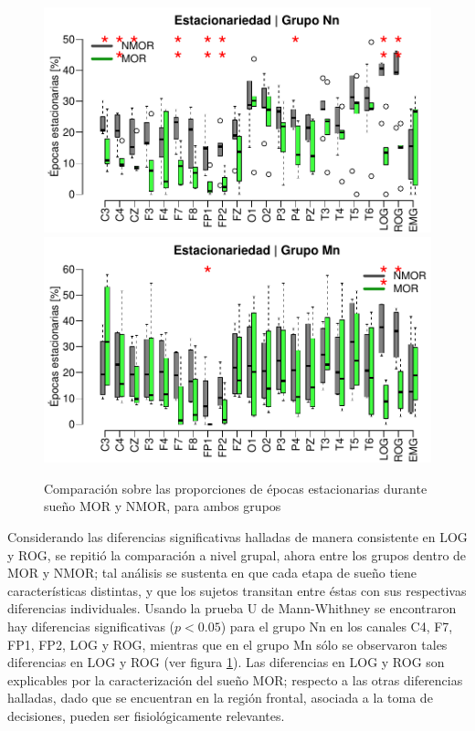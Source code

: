 \begin{figure}
\centering
\includegraphics[width=\linewidth]
{./img_ejemplos/Comparacion_etapas_normal_MOR_vs_NMOR_v2.pdf} \\
\includegraphics[width=\linewidth]
{./img_ejemplos/Comparacion_etapas_pdc_MOR_vs_NMOR_v2.pdf} \\
\caption{Comparación sobre las proporciones de épocas estacionarias durante sueño MOR y NMOR, para 
ambos grupos}
\label{comparacion_verde}
\end{figure}

Considerando las diferencias significativas halladas de manera consistente en LOG y ROG, se
repitió la comparación a nivel grupal, ahora entre los grupos dentro de MOR y NMOR; tal análisis
se sustenta en que cada etapa de sueño tiene características distintas, y que los sujetos transitan 
entre éstas con sus respectivas diferencias individuales.
Usando la prueba U de Mann-Whithney se encontraron hay diferencias significativas ($p<0.05$) para 
el grupo Nn en los canales C4, F7, FP1, FP2, LOG y ROG, mientras que en el grupo Mn 
sólo se observaron tales diferencias en LOG y ROG (ver figura \ref{comparacion_verde}).
Las diferencias en LOG y ROG son explicables por la caracterización del sueño MOR; 
respecto a las otras diferencias halladas, dado que se encuentran en la región frontal, asociada a 
la toma de decisiones, pueden ser fisiológicamente relevantes.

